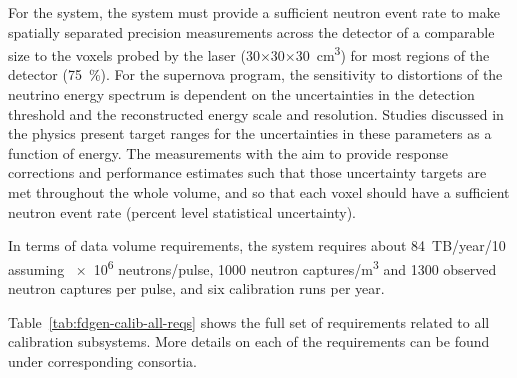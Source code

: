 For the  system, the system must provide a sufficient neutron event rate to make spatially separated precision measurements across the detector of a comparable size to the voxels probed by the laser (\num{30}$\times$\num{30}$\times$\SI{30}{\cubic\cm}) for most regions of the detector (\SI{75}{\%}). 
For the supernova program, the sensitivity to distortions of the neutrino energy spectrum is dependent on the uncertainties in the detection threshold and the reconstructed energy scale and resolution. Studies discussed in the physics  present target ranges for the uncertainties in these parameters as a function of energy. The measurements with the  aim to provide response corrections and performance estimates such that those uncertainty targets are met throughout the whole volume, and so that each voxel should have a sufficient neutron event rate (percent level statistical uncertainty).



In terms of data volume requirements, the  system requires about \num{84}~TB/year/\SI{10}{\kt} assuming \num{e6} neutrons/pulse, \num{1000} neutron captures/\si{\cubic\m}
and \num{1300} observed neutron captures per pulse, and six calibration runs per year. 



Table~\ref{tab:fdgen-calib-all-reqs} shows the full set of requirements related to all calibration subsystems. More details on each of the requirements can be found under corresponding consortia.   



%



